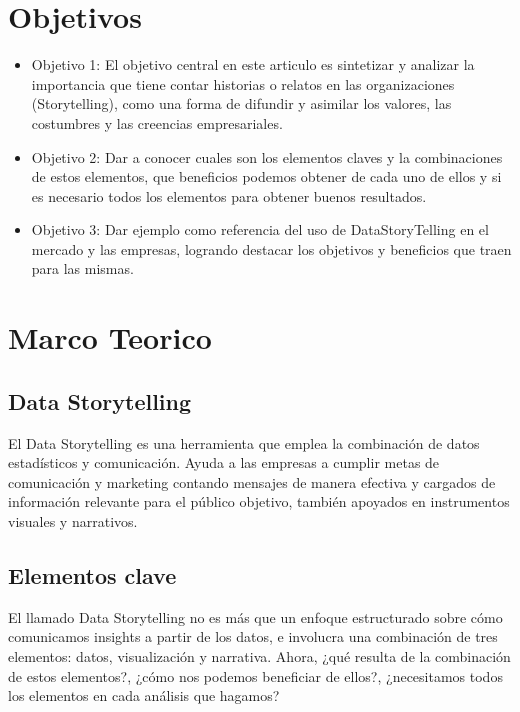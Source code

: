\documentclass[preprint,12pt]{elsarticle}
\begin{document}
	

\section{Objetivos}
		\begin{itemize}
		\item Objetivo 1: El objetivo central en este articulo es sintetizar y analizar la importancia que tiene contar historias o relatos en las organizaciones (Storytelling), como una forma de difundir y asimilar los valores, las costumbres y las creencias empresariales.
		\item Objetivo 2: Dar a conocer cuales son los elementos claves y la combinaciones de estos elementos, que beneficios podemos obtener de cada uno de ellos y si es necesario todos los elementos para obtener buenos resultados.
		\item Objetivo 3: Dar ejemplo  como referencia del uso de DataStoryTelling en el mercado y las empresas, logrando destacar los objetivos y beneficios que traen para las mismas.
	\end{itemize}

	

\section{Marco Teorico}
	\label{S:1}
\subsection{Data Storytelling}	

	El Data Storytelling es una herramienta que emplea la combinación de datos estadísticos y comunicación. Ayuda a las empresas a cumplir metas de comunicación y marketing contando mensajes de manera efectiva y cargados de información relevante para el público objetivo, también apoyados en instrumentos visuales y narrativos.\\
		
	\subsection{Elementos clave}
	
	El llamado Data Storytelling no es más que un enfoque estructurado sobre cómo comunicamos insights a partir de los datos, e involucra una combinación de tres elementos: datos, visualización y narrativa.
Ahora, ¿qué resulta de la combinación de estos elementos?, ¿cómo nos podemos beneficiar de ellos?, ¿necesitamos todos los elementos en cada análisis que hagamos?\\
\end{document}
